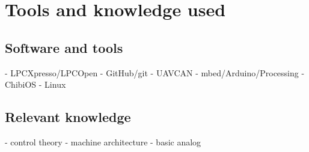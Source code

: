 \section{Tools and knowledge used}


\subsection{Software and tools}

- LPCXpresso/LPCOpen
- GitHub/git
- UAVCAN
- mbed/Arduino/Processing
- ChibiOS
- Linux

\subsection{Relevant knowledge}

- control theory
- machine architecture
- basic analog
